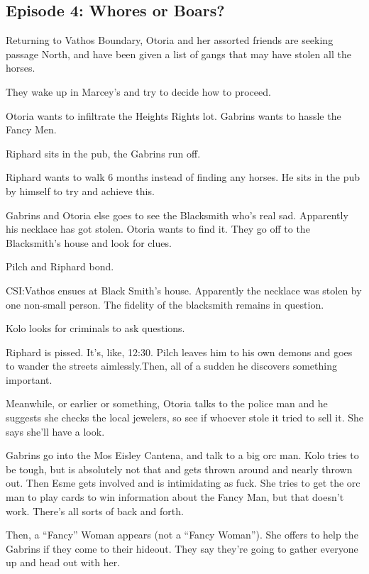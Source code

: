 \subsection{Episode 4: Whores or Boars?}

Returning to Vathos Boundary, Otoria and her assorted friends are seeking passage North, and have been given a list of gangs that may have stolen all the horses.\medskip

They wake up in Marcey’s and try to decide how to proceed.\medskip

Otoria wants to infiltrate the Heights Rights lot. Gabrins wants to hassle the Fancy Men.\medskip

Riphard sits in the pub, the Gabrins run off.\medskip

Riphard wants to walk 6 months instead of finding any horses. He sits in the pub by himself to try and achieve this.\medskip

Gabrins and Otoria else goes to see the Blacksmith who’s real sad. Apparently his necklace has got stolen. Otoria wants to find it. They go off to the Blacksmith’s house and look for clues.\medskip

Pilch and Riphard bond.\medskip

CSI:Vathos ensues at Black Smith’s house. Apparently the necklace was stolen by one non-small person. The fidelity of the blacksmith remains in question.\medskip

Kolo looks for criminals to ask questions.\medskip

Riphard is pissed. It’s, like, 12:30. Pilch leaves him to his own demons and goes to wander the streets aimlessly.Then, all of a sudden he discovers something important.\medskip

Meanwhile, or earlier or something, Otoria talks to the police man and he suggests she checks the local jewelers, so see if whoever stole it tried to sell it. She says she’ll have a look.\medskip

Gabrins go into the Mos Eisley Cantena, and talk to a big orc man. Kolo tries to be tough, but is absolutely not that and gets thrown around and nearly thrown out. Then Esme gets involved and is intimidating as fuck. She tries to get the orc man to play cards to win information about the Fancy Man, but that doesn’t work. There’s all sorts of back and forth.\medskip

Then, a “Fancy” Woman appears (not a “Fancy Woman”). She offers to help the Gabrins if they come to their hideout. They say they’re going to gather everyone up and head out with her.\medskip

